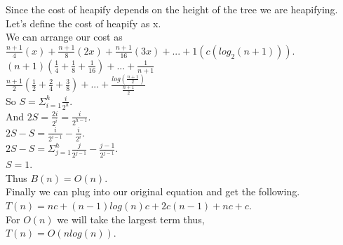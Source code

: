 \documentclass[12pt]{article}
\begin{document}
Since the cost of heapify depends on the height of the tree we are heapifying. Let's define 
the cost of heapify as x.\\
We can arrange our cost as\\
$\frac{n + 1}{4}(x) + \frac{n + 1}{8}(2x) + \frac{n + 1}{16}(3x) + ... + 1(c (log_{2}(n + 1)))$.\\
$(n + 1)(\frac{1}{4} + \frac{1}{8} + \frac{1}{16}) + ... + \frac{1}{n + 1}$\\
$\frac{n + 1}{2}(\frac{1}{2} + \frac{2}{4} + \frac{3}{8}) + ... + \frac{log(\frac{n + 1}{2})}{\frac{n + 1}{2}}$\\
So $S = \Sigma_{i = 1}^{h} \frac{i}{2^{h}}$.\\
And $2S = \frac{2i}{2^{i}} = \frac{i}{2^{h - 1}}$.\\
$2S - S = \frac{i}{2^{i - 1}} - \frac{i}{2^{i}}$.\\
$2S - S = \Sigma_{j = 1}^{h} \frac{j}{2^{j - 1}} - \frac{j - 1}{2^{j - 1}}$.\\
$S = 1$.\\
Thus $B(n) = O(n)$.\\

Finally we can plug into our original equation and get the following.\\
$T(n) = nc + (n-1)log(n)c + 2c(n - 1) + nc + c$.\\
For $O(n)$ we will take the largest term thus,\\
$T(n) = O(nlog(n))$.\\
\rightline{$\blacksquare$}

\par
\end{document}
